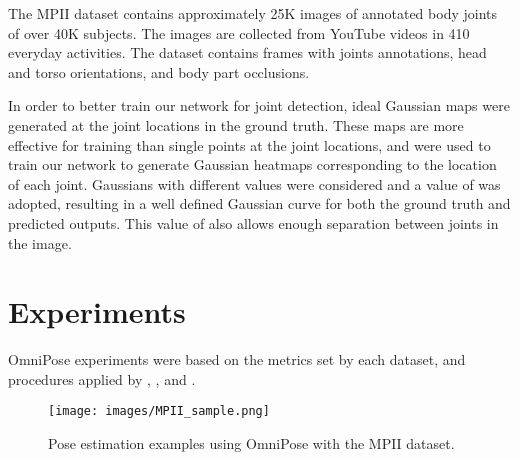 \documentclass[10pt,twocolumn,letterpaper]{article}
\begin{document}
The MPII dataset \cite{MPII} contains approximately 25K images of annotated body joints of over 40K subjects. The images are collected from YouTube videos in 410 everyday activities. The dataset contains frames with joints annotations, head and torso orientations, and body part occlusions.

In order to better train our network for joint detection, ideal Gaussian maps were generated at the joint locations in the ground truth.
These maps are more effective for training than single points at the joint locations, and were used to train our network to generate Gaussian heatmaps corresponding to the location of each joint.
Gaussians with different  values were considered and a value of  was adopted, resulting in a well defined Gaussian curve for both the ground truth and predicted outputs. This value of  also allows enough separation between joints in the image.

\section{Experiments}
OmniPose experiments were based on the metrics set by each dataset, and procedures applied by \cite{HRNet}, \cite{HigherHRNet}, and \cite{DarkPose}.

\begin{figure*}[t]
\begin{center}
\texttt{[image: images/MPII\_sample.png]}
\end{center}
  \caption{Pose estimation examples using OmniPose with the MPII dataset.}
\label{fig:MPII_sample}
\end{figure*}
\end{document}
